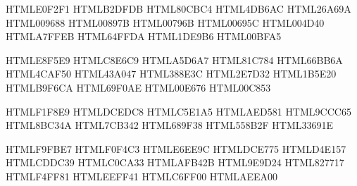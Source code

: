 \definecolor{Teal-50}         {HTML}{E0F2F1}
\definecolor{Teal-100}        {HTML}{B2DFDB}
\definecolor{Teal-200}        {HTML}{80CBC4}
\definecolor{Teal-300}        {HTML}{4DB6AC}
\definecolor{Teal-400}        {HTML}{26A69A}
\definecolor{Teal-500}        {HTML}{009688}
\definecolor{Teal-600}        {HTML}{00897B}
\definecolor{Teal-700}        {HTML}{00796B}
\definecolor{Teal-800}        {HTML}{00695C}
\definecolor{Teal-900}        {HTML}{004D40}
\definecolor{Teal-A100}       {HTML}{A7FFEB}
\definecolor{Teal-A200}       {HTML}{64FFDA}
\definecolor{Teal-A400}       {HTML}{1DE9B6}
\definecolor{Teal-A700}       {HTML}{00BFA5}

\definecolor{Green-50}        {HTML}{E8F5E9}
\definecolor{Green-100}       {HTML}{C8E6C9}
\definecolor{Green-200}       {HTML}{A5D6A7}
\definecolor{Green-300}       {HTML}{81C784}
\definecolor{Green-400}       {HTML}{66BB6A}
\definecolor{Green-500}       {HTML}{4CAF50}
\definecolor{Green-600}       {HTML}{43A047}
\definecolor{Green-700}       {HTML}{388E3C}
\definecolor{Green-800}       {HTML}{2E7D32}
\definecolor{Green-900}       {HTML}{1B5E20}
\definecolor{Green-A100}      {HTML}{B9F6CA}
\definecolor{Green-A200}      {HTML}{69F0AE}
\definecolor{Green-A400}      {HTML}{00E676}
\definecolor{Green-A700}      {HTML}{00C853}

\definecolor{Light-Green-50}  {HTML}{F1F8E9}
\definecolor{Light-Green100}  {HTML}{DCEDC8}
\definecolor{Light-Green200}  {HTML}{C5E1A5}
\definecolor{Light-Green300}  {HTML}{AED581}
\definecolor{Light-Green400}  {HTML}{9CCC65}
\definecolor{Light-Green500}  {HTML}{8BC34A}
\definecolor{Light-Green600}  {HTML}{7CB342}
\definecolor{Light-Green700}  {HTML}{689F38}
\definecolor{Light-Green800}  {HTML}{558B2F}
\definecolor{Light-Green900}  {HTML}{33691E}

\definecolor{Lime-50}         {HTML}{F9FBE7}
\definecolor{Lime-100}        {HTML}{F0F4C3}
\definecolor{Lime-200}        {HTML}{E6EE9C}
\definecolor{Lime-300}        {HTML}{DCE775}
\definecolor{Lime-400}        {HTML}{D4E157}
\definecolor{Lime-500}        {HTML}{CDDC39}
\definecolor{Lime-600}        {HTML}{C0CA33}
\definecolor{Lime-700}        {HTML}{AFB42B}
\definecolor{Lime-800}        {HTML}{9E9D24}
\definecolor{Lime-900}        {HTML}{827717}
\definecolor{Lime-A100}       {HTML}{F4FF81}
\definecolor{Lime-A200}       {HTML}{EEFF41}
\definecolor{Lime-A400}       {HTML}{C6FF00}
\definecolor{Lime-A700}       {HTML}{AEEA00}

